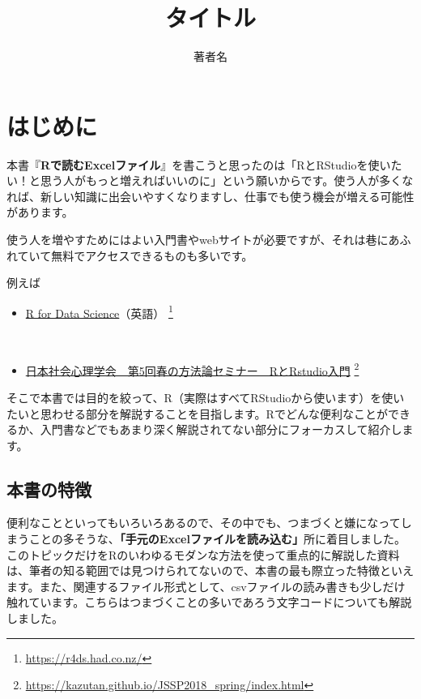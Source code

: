 \documentclass[
  xelatex,ja=standard, b5paper]{bxjsbook}
\title{タイトル}
\author{著者名}
\date{}
\providecommand{\tightlist}{%
  \setlength{\itemsep}{0pt}\setlength{\parskip}{0pt}}
\begin{document}
\maketitle

{
\setcounter{tocdepth}{1}
\tableofcontents
}
\hypertarget{hajimeni}{%
\chapter*{はじめに}\label{hajimeni}}

本書『\textbf{Rで読むExcelファイル}』を書こうと思ったのは「RとRStudioを使いたい！と思う人がもっと増えればいいのに」という願いからです。使う人が多くなれば、新しい知識に出会いやすくなりますし、仕事でも使う機会が増える可能性があります。

使う人を増やすためにはよい入門書やwebサイトが必要ですが、それは巷にあふれていて無料でアクセスできるものも多いです。

例えば

\begin{itemize}
\tightlist
\item
  \href{https://r4ds.had.co.nz/}{R for Data Science}（英語） \footnote{\url{https://r4ds.had.co.nz/}}\strut \\
\item
  \href{https://kazutan.github.io/JSSP2018_spring/index.html}{日本社会心理学会　第5回春の方法論セミナー　RとRstudio入門} \footnote{\url{https://kazutan.github.io/JSSP2018_spring/index.html}}
\end{itemize}

そこで本書では目的を絞って、R（実際はすべてRStudioから使います）を使いたいと思わせる部分を解説することを目指します。Rでどんな便利なことができるか、入門書などでもあまり深く解説されてない部分にフォーカスして紹介します。

\hypertarget{ux672cux66f8ux306eux7279ux5fb4}{%
\section*{本書の特徴}\label{ux672cux66f8ux306eux7279ux5fb4}}

便利なことといってもいろいろあるので、その中でも、つまづくと嫌になってしまうことの多そうな、\textbf{「手元のExcelファイルを読み込む」}所に着目しました。このトピックだけをRのいわゆるモダンな方法を使って重点的に解説した資料は、筆者の知る範囲では見つけられてないので、本書の最も際立った特徴といえます。また、関連するファイル形式として、csvファイルの読み書きも少しだけ触れています。こちらはつまづくことの多いであろう文字コードについても解説しました。
\end{document}
